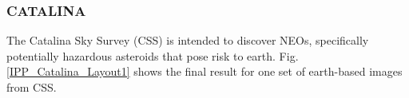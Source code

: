 

\vspace{-0.7cm}
\subsubsection{CATALINA}
The Catalina Sky Survey (CSS) \cite{larson1998catalina,drake2009first} is intended to discover NEOs, specifically potentially hazardous asteroids that pose risk to earth. Fig. \ref{IPP_Catalina_Layout1} 
shows the final result for one set of earth-based images from CSS. 
\vspace{-0.3cm}
